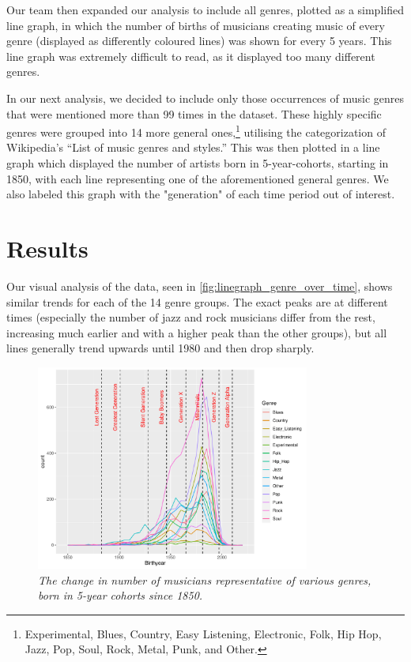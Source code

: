 \documentclass{article}
\begin{document}
Our team then expanded our analysis to include all genres, plotted as a simplified line graph, in which the number of births of musicians creating music of every genre (displayed as differently coloured lines) was shown for every 5 years. This line graph was extremely difficult to read, as it displayed too many different genres.

In our next analysis, we decided to include only those occurrences of music genres that were mentioned more than 99 times in the dataset. These highly specific genres were grouped into 14 more general ones,\footnote{Experimental, Blues, Country, Easy Listening, Electronic, Folk, Hip Hop, Jazz, Pop, Soul, Rock, Metal, Punk, and Other.} utilising the categorization of Wikipedia’s “List of music genres and styles.” This was then plotted in a line graph which displayed the number of artists born in 5-year-cohorts, starting in 1850, with each line representing one of the aforementioned general genres. We also labeled this graph with the "generation" of each time period out of interest.

\section{Results}
Our visual analysis of the data, seen in \autoref{fig:linegraph_genre_over_time}, shows similar trends for each of the 14 genre groups. The exact peaks are at different times (especially the number of jazz and rock musicians differ from the rest, increasing much earlier and with a higher peak than the other groups), but all lines generally trend upwards until 1980 and then drop sharply. 

\begin{figure}
    \centering
    \includegraphics[width = 9cm]{first_plot.pdf}
    \caption{\textit{The change in number of musicians representative of various genres, born in 5-year cohorts since 1850.}}
    \label{fig:linegraph_genre_over_time}
\end{figure}
\end{document}
